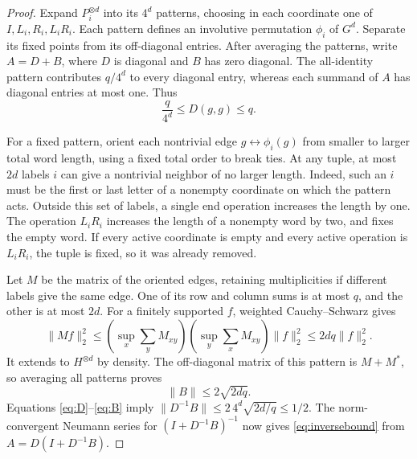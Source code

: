 \documentclass[11pt]{amsart}
\begin{document}
\begin{proof}
Expand $P_i^{\otimes d}$ into its $4^d$ patterns, choosing in each coordinate
one of $I,L_i,R_i,L_iR_i$. Each pattern defines an involutive permutation
$\phi_i$ of $G^d$. Separate its fixed points from its off-diagonal entries.
After averaging the patterns, write $A=D+B$, where $D$ is diagonal and $B$
has zero diagonal. The all-identity pattern contributes $q/4^d$ to every
diagonal entry, whereas each summand of $A$ has diagonal entries at most one.
Thus
\begin{equation}\label{eq:D}
\frac{q}{4^d}\leq D(g,g)\leq q.
\end{equation}

For a fixed pattern, orient each nontrivial edge $g\leftrightarrow\phi_i(g)$
from smaller to larger total word length, using a fixed total order to break
ties. At any tuple, at most $2d$ labels $i$ can give a nontrivial neighbor of
no larger length. Indeed, such an $i$ must be the first or last letter of a
nonempty coordinate on which the pattern acts. Outside this set of labels,
a single end operation increases the length by one. The operation $L_iR_i$
increases the length of a nonempty word by two, and fixes the empty word.
If every active coordinate is empty and every active operation is $L_iR_i$,
the tuple is fixed, so it was already removed.

Let $M$ be the matrix of the oriented edges, retaining multiplicities if
different labels give the same edge. One of its row and column sums is at
most $q$, and the other is at most $2d$. For a finitely supported $f$, weighted
Cauchy--Schwarz gives
\[
\|Mf\|_2^2\leq
\left(\sup_x\sum_y M_{xy}\right)
\left(\sup_y\sum_x M_{xy}\right)\|f\|_2^2
\leq2dq\|f\|_2^2.
\]
It extends to $H^{\otimes d}$ by density. The off-diagonal matrix of this
pattern is $M+M^*$, so averaging all patterns proves
\begin{equation}\label{eq:B}
\|B\|\leq2\sqrt{2dq}.
\end{equation}
Equations \eqref{eq:D}--\eqref{eq:B} imply
$\|D^{-1}B\|\leq2\,4^d\sqrt{2d/q}\leq1/2$. The norm-convergent Neumann
series for $(I+D^{-1}B)^{-1}$ now gives \eqref{eq:inversebound} from
$A=D(I+D^{-1}B)$.
\end{proof}
\end{document}
